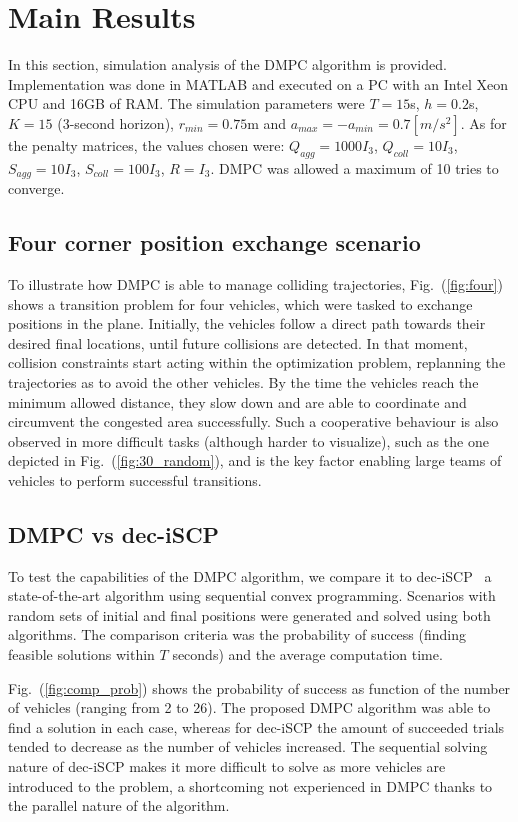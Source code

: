 \section{Main Results}
\label{sec:results}

In this section, simulation analysis of the DMPC algorithm is provided. Implementation was done in MATLAB and executed on a PC with an Intel Xeon CPU and 16GB of RAM. The simulation parameters were $T = 15$s, $h = 0.2$s, $K = 15$ (3-second horizon), $r_{min} = 0.75$m and $a_{max} = -a_{min} = 0.7 [m/s^2]$. As for the penalty matrices, the values chosen were: $Q_{agg} = 1000I_3$, $Q_{coll} = 10I_3$, $S_{agg} = 10I_3$, $S_{coll} = 100I_3$, $R = I_3$. DMPC was allowed a maximum of 10 tries to converge.

\subsection{Four corner position exchange scenario}
To illustrate how DMPC is able to manage colliding trajectories, Fig.~(\ref{fig:four}) shows a transition problem for four vehicles, which were tasked to exchange positions in the plane. Initially, the vehicles follow a direct path towards their desired final locations, until future collisions are detected. In that moment, collision constraints start acting within the optimization problem, replanning the trajectories as to avoid the other vehicles. By the time the vehicles reach the minimum allowed distance, they slow down and are able to coordinate and circumvent the congested area successfully. Such a cooperative behaviour is also observed in more difficult tasks (although harder to visualize), such as the one depicted in Fig.~(\ref{fig:30_random}), and is the key factor enabling large teams of vehicles to perform successful transitions.


\subsection{DMPC vs dec-iSCP}
To test the capabilities of the DMPC algorithm, we compare it to dec-iSCP \cite{chen2015decoupled}\, a state-of-the-art algorithm using sequential convex programming. Scenarios with random sets of initial and final positions were generated and solved using both algorithms. The comparison criteria was the probability of success (finding feasible solutions within $T$ seconds) and the average computation time.

Fig.~(\ref{fig:comp_prob}) shows the probability of success as function of the number of vehicles (ranging from 2 to 26). The proposed DMPC algorithm was able to find a solution in each case, whereas for dec-iSCP the amount of succeeded trials tended to decrease as the number of vehicles increased. The sequential solving nature of dec-iSCP makes it more difficult to solve as more vehicles are introduced to the problem, a shortcoming not experienced in DMPC thanks to the parallel nature of the algorithm.

